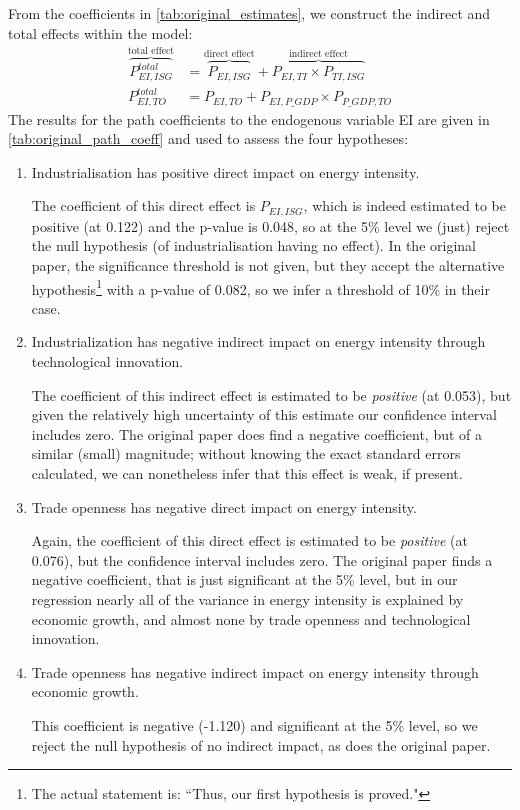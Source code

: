 \documentclass[11pt,a4paper]{article}
\begin{document}
From the coefficients in \cref{tab:original_estimates}, we construct the indirect and total effects within the model:
\begin{align}
\overbrace{P^{total}_{EI,ISG}}^\text{total effect} &=  
\overbrace{P_{EI,ISG}}^\text{direct effect} + 
\overbrace{P_{EI,TI} \times P_{TI,ISG}}^\text{indirect effect} \\
P^{total}_{EI,TO} &=  
P_{EI,TO} + 
P_{EI,P\_GDP} \times P_{P\_GDP,TO}
\end{align}
The results for the path coefficients to the endogenous variable EI are given in \cref{tab:original_path_coeff} and used to assess the four hypotheses:

\begin{enumerate}[label=\textbf{H.\arabic*}]
\item Industrialisation has positive direct impact on energy intensity.

The coefficient of this direct effect is $P_{EI,ISG}$, which is indeed estimated to be positive (at 0.122) and the p-value is 0.048, so at the 5\% level we (just) reject the null hypothesis (of industrialisation having no effect).
In the original paper, the significance threshold is not given, but they accept the alternative hypothesis\footnote{
The actual statement is: ``Thus, our first hypothesis is proved." 
} with a p-value of 0.082, so we infer a threshold of 10\% in their case.

\item Industrialization has negative indirect impact on energy intensity through technological innovation.

The coefficient of this indirect effect is estimated to be \emph{positive} (at 0.053), but given the relatively high uncertainty of this estimate our confidence interval includes zero.
The original paper does find a negative coefficient, but of a similar (small) magnitude; without knowing the exact standard errors calculated, we can nonetheless infer that this effect is weak, if present.

\item Trade openness has negative direct impact on energy intensity.

Again, the coefficient of this direct effect is estimated to be \emph{positive} (at 0.076), but the confidence interval includes zero.
The original paper finds a negative coefficient, that is just significant at the 5\% level, but in our regression nearly all of the variance in energy intensity is explained by economic growth, and almost none by trade openness and technological innovation. 

\item Trade openness has negative indirect impact on energy intensity through economic growth.

This coefficient is negative (-1.120) and significant at the 5\% level, so we reject the null hypothesis of no indirect impact, as does the original paper.

\end{enumerate}
\end{document}
